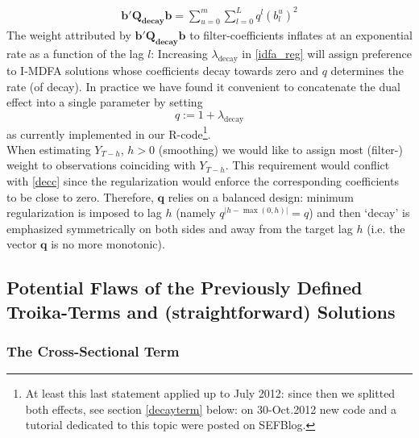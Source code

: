 \documentclass[11pt]{article}
\begin{document}
\begin{eqnarray}\label{decc}
\mathbf{b'Q_{decay}b}= \sum_{u=0}^m\sum_{l=0}^L q^{l} (b_l^u)^2
\end{eqnarray}
The weight attributed by $\mathbf{b'Q_{decay}b}$ to filter-coefficients inflates at an exponential rate as a function of the lag $l$:  Increasing $\lambda_{\textrm{decay}}$ in \ref{idfa_reg} will assign preference to I-MDFA solutions whose coefficients decay towards zero and $q$ determines the rate (of decay). In practice we have found it convenient to concatenate the dual effect into a single parameter by setting 
\begin{equation}\label{qdef}
q:=1+\lambda_{\textrm{decay}}
\end{equation}
 as currently implemented in our R-code\footnote{At least this last statement applied up to July 2012: since then we splitted both effects, see section \ref{decayterm} below: on 30-Oct.2012 new code and a tutorial dedicated to this topic were posted on SEFBlog.}. \\
When estimating $Y_{T-h}$, $h>0$ (smoothing) we would like to assign most (filter-) weight to observations coinciding with $Y_{T-h}$. This requirement would conflict with \ref{decc} since the regularization would enforce the corresponding coefficients to be close to zero. Therefore, $\mathbf{q}$ relies on a balanced design: minimum regularization is imposed to lag $h$ (namely ${q}^{|h-\max(0,h)|}=q$) and then `decay' is emphasized symmetrically on both sides and away from the target lag $h$ (i.e. the vector $\mathbf{q}$ is no more monotonic).



\subsection{Potential Flaws of the Previously Defined Troika-Terms and (straightforward) Solutions}


\subsubsection{The Cross-Sectional Term}
\end{document}
